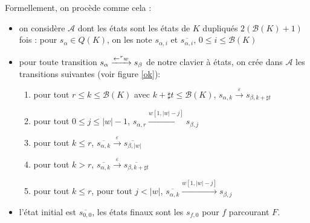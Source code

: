 \documentclass[12pt, a4paper]{article}
\renewcommand{\bar}{\overline}
\newcommand{\A}{\mathcal{A}}
\begin{document}
    Formellement, on procède comme cela :
    \begin{itemize}
        \item on considère $\A$ dont les états sont les états de $K$ dupliqués $2(\mathcal{B}(K) + 1)$ fois : pour $s_\alpha \in Q(K)$, on les note $s_{\alpha, i}$ et $\overline{s_{\alpha, i}}$, $0 \leqslant i \leqslant \mathcal{B}(K)$
        \item pour toute transition $s_{\alpha} \xrightarrow{\mathord{\leftarrow}^r w} s_{\beta}$ de notre clavier à états, on crée dans $\A$ les transitions suivantes (voir figure \ref{ok}):
            \begin{enumerate}
                \item pour tout $r \leqslant k \leqslant \mathcal{B}(K)$ avec $k + \sharp t \leqslant \mathcal{B}(K)$, $s_{\alpha, k} \xrightarrow{\varepsilon} s_{\beta, k + \sharp t}$
                \item pour tout $0 \leqslant j \leqslant |w| - 1$, $s_{\alpha, r} \xrightarrow{w[1,|w|-j]} s_{\beta, j}$
                \item pour tout $k \leqslant r$, $\overline{s_{\alpha,k}} \xrightarrow{\varepsilon} \overline{s_{\beta,|w|}}$
                \item pour tout $k > r$, $\overline{s_{\alpha,k}} \xrightarrow{\varepsilon} \overline{s_{\beta,k+\sharp t}}$
                \item pour tout $k \leqslant r$, pour tout $j < |w|$, $\overline{s_{\alpha,k}} \xrightarrow{w[1,|w|-j]} s_{\beta, j}$
            \end{enumerate} 
        \item l'état initial est $\overline{s_{0,0}}$, les états finaux sont les $s_{f,0}$ pour $f$ parcourant $F$.
    \end{itemize}
\end{document}
